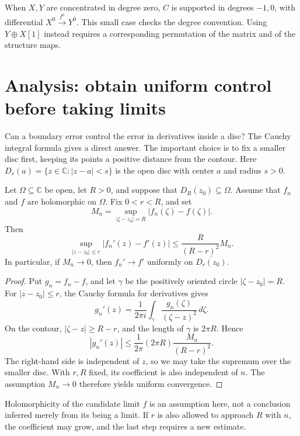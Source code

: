 \documentclass[11pt,a4paper]{article}
\begin{document}
When $X,Y$ are concentrated in degree zero, $C$ is supported in degrees $-1,0$, with differential $X^0\xrightarrow{f^0}Y^0$. This small case checks the degree convention. Using $Y\oplus X[1]$ instead requires a corresponding permutation of the matrix and of the structure maps.



\clearpage
\section{Analysis: obtain uniform control before taking limits}

Can a boundary error control the error in derivatives inside a disc? The Cauchy integral formula gives a direct answer. The important choice is to fix a smaller disc first, keeping its points a positive distance from the contour. Here $D_s(a)=\{z\in\mathbb C:|z-a|<s\}$ is the open disc with center $a$ and radius $s>0$.

\begin{proposition}\label{thm:cauchy-transfer}

Let $\Omega\subseteq\mathbb C$ be open, let $R>0$, and suppose that $\overline{D_R(z_0)}\subseteq\Omega$. Assume that $f_n$ and $f$ are holomorphic on $\Omega$. Fix $0<r<R$, and set
\[
M_n=\sup_{|\zeta-z_0|=R}|f_n(\zeta)-f(\zeta)|.
\]
Then
\[
\sup_{|z-z_0|\le r}|f_n'(z)-f'(z)|
\le \frac{R}{(R-r)^2}M_n.
\]
In particular, if $M_n\to0$, then $f_n'\to f'$ uniformly on $\overline{D_r(z_0)}$.

\end{proposition}

\begin{proof}

Put $g_n=f_n-f$, and let $\gamma$ be the positively oriented circle $|\zeta-z_0|=R$. For $|z-z_0|\le r$, the Cauchy formula for derivatives gives
\[
g_n'(z)=\frac{1}{2\pi i}\int_\gamma
\frac{g_n(\zeta)}{(\zeta-z)^2}\,d\zeta.
\]
On the contour, $|\zeta-z|\ge R-r$, and the length of $\gamma$ is $2\pi R$. Hence
\[
|g_n'(z)|\le \frac{1}{2\pi}(2\pi R)
\frac{M_n}{(R-r)^2}.
\]
The right-hand side is independent of $z$, so we may take the supremum over the smaller disc. With $r,R$ fixed, its coefficient is also independent of $n$. The assumption $M_n\to0$ therefore yields uniform convergence.
\end{proof}

Holomorphicity of the candidate limit $f$ is an assumption here, not a conclusion inferred merely from its being a limit. If $r$ is also allowed to approach $R$ with $n$, the coefficient may grow, and the last step requires a new estimate.
\end{document}

